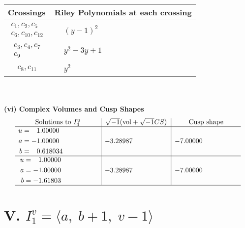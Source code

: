 \documentclass[1p]{elsarticle_modified}
\theoremstyle{definition}
\newcommand{\I}{\sqrt{-1}}
\begin{document}
\begin{tabular}{m{50pt}|m{274pt}}
Crossings & \hspace{64pt}Riley Polynomials at each crossing \\
\hline $$\begin{aligned}c_{1},c_{2},c_{5}\\c_{6},c_{10},c_{12}\end{aligned}$$&$\begin{aligned}
&(y-1)^2
\end{aligned}$\\
\hline $$\begin{aligned}c_{3},c_{4},c_{7}\\c_{9}\end{aligned}$$&$\begin{aligned}
&y^2-3 y+1
\end{aligned}$\\
\hline $$\begin{aligned}c_{8},c_{11}\end{aligned}$$&$\begin{aligned}
&y^2
\end{aligned}$\\
\hline
\end{tabular}\\~\\
\newpage\flushleft \textbf{(vi) Complex Volumes and Cusp Shapes}
$$\begin{array}{c|c|c}  
\text{Solutions to }I^u_{4}& \I (\text{vol} + \sqrt{-1}CS) & \text{Cusp shape}\\
 \hline 
\begin{aligned}
u &= \phantom{-}1.00000\phantom{ +0.000000I} \\
a &= -1.00000\phantom{ +0.000000I} \\
b &= \phantom{-}0.618034\phantom{ +0.000000I}\end{aligned}
 & -3.28987\phantom{ +0.000000I} & -7.00000\phantom{ +0.000000I} \\ \hline\begin{aligned}
u &= \phantom{-}1.00000\phantom{ +0.000000I} \\
a &= -1.00000\phantom{ +0.000000I} \\
b &= -1.61803\phantom{ +0.000000I}\end{aligned}
 & -3.28987\phantom{ +0.000000I} & -7.00000\phantom{ +0.000000I}\\
 \hline 
 \end{array}$$\newpage\newpage\renewcommand{\arraystretch}{1}
\centering \section*{V. $I^v_{1}= \langle a,\;b+1,\;v-1 \rangle$}
\end{document}
